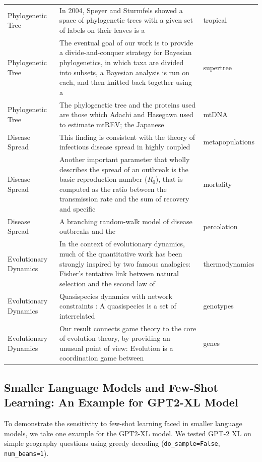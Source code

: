 \documentclass[10pt]{article}
\begin{document}
\begin{table}
\begin{tabular}{p{3.5cm}p{9cm}p{2cm}}
\midrule
Phylogenetic Tree & In 2004, Speyer and Sturmfels showed a space of phylogenetic trees with a given set of labels on their leaves is a & tropical \\
Phylogenetic Tree & The eventual goal of our work is to provide a divide-and-conquer strategy for Bayesian phylogenetics, in which taxa are divided into subsets, a Bayesian analysis is run on each, and then knitted back together using a & supertree \\
Phylogenetic Tree & The phylogenetic tree and the proteins used are those which Adachi and Hasegawa used to estimate mtREV; the Japanese & mtDNA \\
Disease Spread & This finding is consistent with the theory of infectious disease spread in highly coupled & metapopulations \\
Disease Spread & Another important parameter that wholly describes the spread of an outbreak is the basic reproduction number ($R_0$), that is computed as the ratio between the transmission rate and the sum of recovery and specific & mortality \\
Disease Spread & A branching random-walk model of disease outbreaks and the & percolation \\
Evolutionary Dynamics & In the context of evolutionary dynamics, much of the quantitative work has been strongly inspired by two famous analogies: Fisher's tentative link between natural selection and the second law of & thermodynamics \\
Evolutionary Dynamics & Quasispecies dynamics with network constraints : A quasispecies is a set of interrelated & genotypes \\
Evolutionary Dynamics & Our result connects game theory to the core of evolution theory, by providing an unusual point of view: Evolution is a coordination game between & genes \\
    \end{tabular}
    \label{tab:prompt-target}
\end{table}


\subsection{Smaller Language Models and Few-Shot Learning: An Example for GPT2-XL Model}
\label{subsec:few-shot-issue-gpt2-xl}

To demonstrate the sensitivity to few-shot learning faced in smaller language models, we take one example for the GPT2-XL model. We tested GPT-2 XL on simple geography questions using greedy decoding (\texttt{do\_sample=False}, \texttt{num\_beams=1}).
\end{document}

